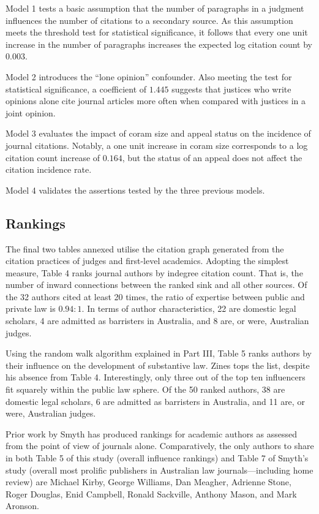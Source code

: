 Model 1 tests a basic assumption that the number of paragraphs in a judgment influences the number of citations to a secondary source. As this assumption meets the threshold test for statistical significance, it follows that every one unit increase in the number of paragraphs increases the expected log citation count by $0.003$. 

Model 2 introduces the ``lone opinion'' confounder. Also meeting the test for statistical significance, a coefficient of $1.445$ suggests that justices who write opinions alone cite journal articles more often when compared with justices in a joint opinion. 

Model 3 evaluates the impact of coram size and appeal status on the incidence of journal citations. Notably, a one unit increase in coram size corresponds to a log citation count increase of $0.164$, but the status of an appeal does not affect the citation incidence rate. 

Model 4 validates the assertions tested by the three previous models.

\subsection{Rankings}

The final two tables annexed utilise the citation graph generated from the citation practices of judges and first-level academics. Adopting the simplest measure, Table 4 ranks journal authors by indegree citation count. That is, the number of inward connections between the ranked sink and all other sources. Of the 32 authors cited at least 20 times, the ratio of expertise between public and private law is $0.94:1$. In terms of author characteristics, 22 are domestic legal scholars, 4 are admitted as barristers in Australia, and 8 are, or were, Australian judges.

Using the random walk algorithm explained in Part III, Table 5 ranks authors by their influence on the development of substantive law. Zines tops the list, despite his absence from Table 4. Interestingly, only three out of the top ten influencers fit squarely within the public law sphere. Of the 50 ranked authors, 38 are domestic legal scholars, 6 are admitted as barristers in Australia, and 11 are, or were, Australian judges. 

Prior work by Smyth has produced rankings for academic authors as assessed from the point of view of journals alone. Comparatively, the only authors to share in both Table 5 of this study (overall influence rankings) and Table 7 of Smyth's study (overall most prolific publishers in Australian law journals---including home review) are Michael Kirby, George Williams, Dan Meagher, Adrienne Stone, Roger Douglas, Enid Campbell, Ronald Sackville, Anthony Mason, and Mark Aronson.
